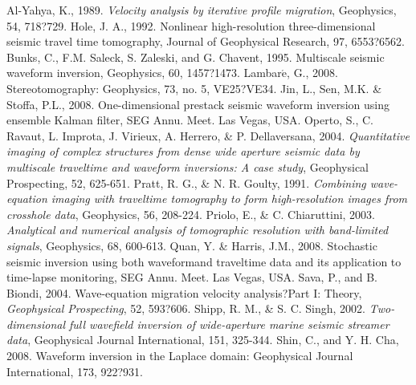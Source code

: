 \documentclass[mreferee]{gji}
\begin{document}
\begin{thebibliography}{}
 Al-Yahya, K., 1989. \textit{Velocity analysis by iterative profile migration}, Geophysics, 54, 718?729.
 Hole, J. A., 1992. Nonlinear high-resolution three-dimensional seismic travel time tomography, Journal of Geophysical Research, 97, 6553?6562.
 Bunks, C., F.M. Saleck, S. Zaleski, and G. Chavent, 1995. Multiscale seismic waveform inversion,  Geophysics, 60, 1457?1473.
 Lambar$\acute{\textrm{e}}$, G., 2008. Stereotomography: Geophysics, 73, no. 5, VE25?VE34.
 Jin, L., Sen, M.K. \& Stoffa, P.L., 2008. One-dimensional prestack seismic waveform inversion using ensemble Kalman filter, SEG Annu. Meet. Las Vegas, USA.
 Operto, S., C. Ravaut, L. Improta, J. Virieux, A. Herrero, \& P. Dellaversana, 2004. \textit{Quantitative imaging of complex structures from dense wide aperture seismic data by multiscale traveltime and waveform inversions: A case study}, Geophysical Prospecting, 52, 625-651.
 Pratt, R. G., \& N. R. Goulty, 1991. \textit{Combining wave-equation imaging with traveltime tomography to form high-resolution images from crosshole data}, Geophysics, 56, 208-224.
 Priolo, E., \& C. Chiaruttini, 2003. \textit{Analytical and numerical analysis of tomographic resolution with band-limited signals}, Geophysics, 68, 600-613.
 Quan, Y. \& Harris, J.M., 2008. Stochastic seismic inversion using both waveformand traveltime data and its application to time-lapse monitoring, SEG Annu. Meet. Las Vegas, USA.
 Sava, P., and B. Biondi, 2004. Wave-equation migration velocity analysis?Part I: Theory, \textit{Geophysical Prospecting}, 52, 593?606.
 Shipp, R. M., \& S. C. Singh, 2002. \textit{Two-dimensional full wavefield inversion of wide-aperture marine seismic streamer data}, Geophysical Journal International, 151, 325-344.
 Shin, C., and Y. H. Cha, 2008. Waveform inversion in the Laplace domain: Geophysical Journal International, 173, 922?931.

\end{thebibliography}
\end{document}

